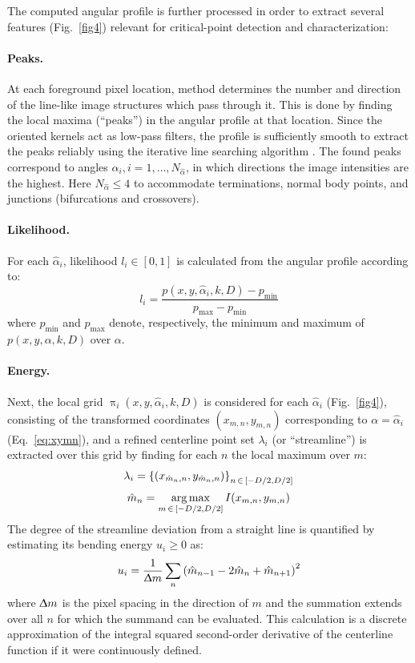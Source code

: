 The computed angular profile is further processed in order to extract several features (Fig.~\ref{fig4}) relevant for critical-point detection and characterization:

\paragraph{Peaks.} At each foreground pixel location, method determines the number and direction of the line-like image structures which pass through it. This is done by finding the local maxima (``peaks'') in the angular profile at that location. Since the oriented kernels act as low-pass filters, the profile is sufficiently smooth to extract the peaks reliably using the iterative line searching algorithm \cite{flannery1992numerical}. The found peaks correspond to angles $\hat{\alpha}_{i}, i=1,\dots,N_{\hat{\alpha}}$, in which directions the image intensities are the highest. Here $N_{\hat{\alpha}}\leq 4$ to accommodate terminations, normal body points, and junctions (bifurcations and crossovers).

\paragraph{Likelihood.} For each $\hat{\alpha}_{i}$, likelihood $l_i \in \left[ 0, 1 \right]  $ is calculated from the angular profile according to:
\begin{equation} 
l_i = \frac{p(x,y,\hat{\alpha}_{i},k,D)-p_{\min}}{p_{\max}-p_{\min}}
\end{equation}
where $p_{\min}$ and $p_{\max}$ denote, respectively, the minimum and maximum of $p(x,y,\alpha,k,D)$ over $\alpha$.

\paragraph{Energy.} Next, the local grid $\uppi_{i}(x,y,\hat{\alpha}_{i},k,D)$ is considered for each $\hat{\alpha}_{i}$ (Fig.~\ref{fig4}), consisting of the transformed coordinates $(x_{m,n},y_{m,n})$ corresponding to $\alpha=\hat{\alpha}_{i}$ (Eq.~\ref{eq:xymn}), and a refined centerline point set $\lambda_{i}$ (or ``streamline'') is extracted over this grid by finding for each $n$ the local maximum over $m$:
\begin{gather}
\label{eq:refine-centerline} 
\lambda_{i} = \left\{(x_{\hat{m}_{n},n},y_{\hat{m}_{n},n})\right\}_{n\,\in\,\left[-D/2,D/2\right]}\\[0.5ex]
\hat{m}_{n} = \operatorname*{arg\,max}_{m\,\in\,\left[-D/2,D/2\right]} I(x_{m,n},y_{m,n})
\label{eq:hatm}
\end{gather}
The degree of the streamline deviation from a straight line is quantified by estimating its bending energy $u_{i}\geq0$ as:
\begin{equation}
u_{i} = \frac{1}{\Updelta m}\sum_{n} \left( \hat{m}_{n-1} - 2\hat{m}_{n} + \hat{m}_{n+1} \right)^2
\end{equation}
where $\Updelta m$ is the pixel spacing in the direction of $m$ and the summation extends over all $n$ for which the summand can be evaluated. This calculation is a discrete approximation of the integral squared second-order derivative of the centerline function if it were continuously defined.

